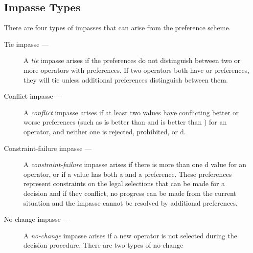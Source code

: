 \subsection{Impasse Types}
\label{ARCH-impasses-types}


There are four types of impasses that can arise from the preference scheme.
\vspace{-12pt}

\begin{description}
\item[Tie impasse ---] 
	A \emph{tie} impasse arises if the preferences do not
        distinguish between two or more operators with 
        preferences. If two operators both have  or 
        preferences, they will tie unless additional preferences distinguish
        between them.\vspace{-8pt}
\item[Conflict impasse ---]
	A \emph{conflict} impasse arises if at least two values have conflicting
        better or worse preferences (such as  is better than 
        and  is better than ) for an operator, and neither
        one is rejected, prohibited, or d.\vspace{-8pt}
\item[Constraint-failure impasse ---]
	A \emph{constraint-failure} impasse arises if there is more than one
        d value for an operator, or if a value has both a
         and a  preference. These preferences
        represent constraints on the legal selections that can be made for a
        decision and if they conflict, no progress can be made from the
        current situation and the impasse cannot be resolved by additional
        preferences.\vspace{-8pt}
\item[No-change impasse ---]
	A \emph{no-change} impasse arises if a new operator is not selected
        during the decision procedure. There are two types of no-change

\end{description}
